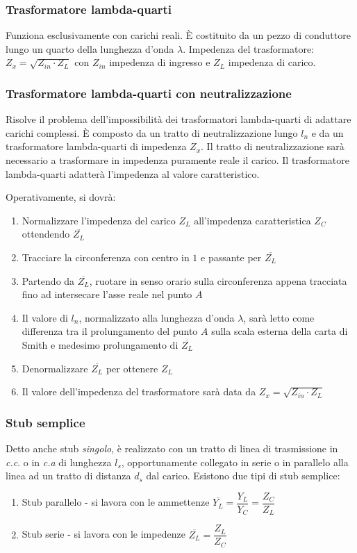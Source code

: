 \documentclass{article}
\begin{document}
\subsubsection{Trasformatore lambda-quarti}
Funziona esclusivamente con carichi reali. \`E costituito da un pezzo di conduttore lungo un quarto della lunghezza d'onda \( \lambda \).
Impedenza del trasformatore: \(\displaystyle  Z_x = \sqrt{Z_{in} \cdot Z_L} \) con \(Z_{in}\) impedenza di ingresso e \(Z_L\) impedenza di carico.

\subsubsection{Trasformatore lambda-quarti con neutralizzazione}
Risolve il problema dell'impossibilità dei trasformatori lambda-quarti di adattare carichi complessi.
\`E composto da un tratto di neutralizzazione lungo \(l_n\) e da un trasformatore lambda-quarti di impedenza \(Z_x\).
Il tratto di neutralizzazione sarà necessario a trasformare in impedenza puramente reale il carico.
Il trasformatore lambda-quarti adatterà l'impedenza al valore caratteristico.

Operativamente, si dovrà:
\begin{enumerate}
	\item Normalizzare l'impedenza del carico \(Z_L\) all'impedenza caratteristica \(Z_C\) ottendendo \(\overline{Z_L}\)
	\item Tracciare la circonferenza con centro in \(1\) e passante per \( \overline{Z_L} \)
	\item Partendo da \(\overline{Z_L}\), ruotare in senso orario sulla circonferenza appena tracciata fino ad intersecare l'asse reale nel punto \(A\)
	\item Il valore di \( l_n \), normalizzato alla lunghezza d'onda \( \lambda \), sarà letto come differenza tra il prolungamento del punto \(A\) sulla scala esterna della carta di Smith e medesimo prolungamento di \(\overline{Z_L}\)
	\item Denormalizzare \(\overline{Z_L}\) per ottenere \(Z_L\)
	\item Il valore dell'impedenza del trasformatore sarà data da \(\displaystyle Z_x = \sqrt{Z_{in} \cdot Z_L} \)
\end{enumerate}

\subsubsection{Stub semplice}
Detto anche stub \textit{singolo}, è realizzato con un tratto di linea di trasmissione in \textit{c.c}. o in \textit{c.a} di lunghezza \(l_s\), opportunamente collegato in serie o in parallelo alla linea ad un tratto di distanza \(d_s\) dal carico.
Esistono due tipi di stub semplice:
\begin{enumerate}
	\item Stub parallelo - si lavora con le ammettenze \( \overline{Y_L} = \dfrac{Y_L}{Y_C} = \dfrac{Z_C}{Z_L} \)
	\item Stub serie - si lavora con le impedenze \( \overline{Z_L} = \dfrac{Z_L}{Z_C} \)
\end{enumerate}
\end{document}
